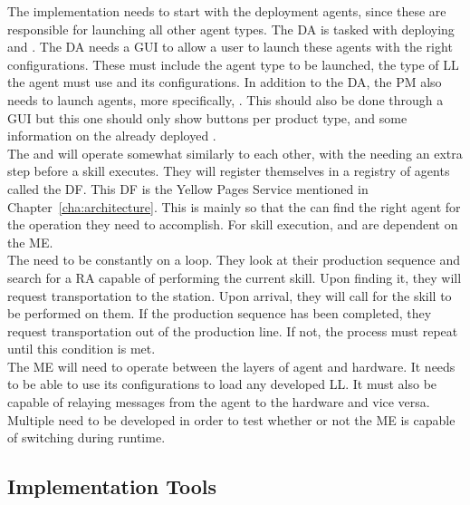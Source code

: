 The implementation needs to start with the deployment agents, since these are responsible for launching all other agent types. The \acrfull{DA} is tasked with deploying  and . The \acrshort{DA} needs a \acrfull{GUI} to allow a user to launch these agents with the right configurations. These must include the agent type to be launched, the type of \acrlong{LL} the agent must use and its configurations. In addition to the \acrshort{DA}, the \acrfull{PM} also needs to launch agents, more specifically, . This should also be done through a \acrshort{GUI} but this one should only show buttons per product type, and some information on the already deployed .\\

The  and  will operate somewhat similarly to each other, with the  needing an extra step before a skill executes. They will register themselves in a registry of agents called the \acrfull{DF}. This \acrshort{DF} is the Yellow Pages Service mentioned in Chapter~\ref{cha:architecture}. This is mainly so that the  can find the right agent for the operation they need to accomplish. For skill execution,  and  are dependent on the \acrlong{ME}.\\

The  need to be constantly on a loop. They look at their production sequence and search for a \acrshort{RA} capable of performing the current skill. Upon finding it, they will request transportation to the station. Upon arrival, they will call for the skill to be performed on them. If the production sequence has been completed, they request transportation out of the production line. If not, the process must repeat until this condition is met.\\

The \acrlong{ME} will need to operate between the layers of agent and hardware. It needs to be able to use its configurations to load any developed \acrlong{LL}. It must also be capable of relaying messages from the agent to the hardware and vice versa. Multiple  need to be developed in order to test whether or not the \acrshort{ME} is capable of switching  during runtime.\\

\subsection{Implementation Tools}
\label{subsec:implementation_tools}

